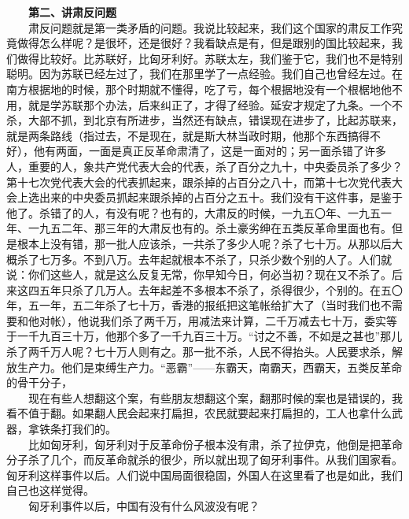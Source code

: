 \documentclass[cn,11pt,chinese]{elegantbook}
\begin{document}
　　\textbf{第二、讲肃反问题}\\
　　肃反问题就是第一类矛盾的问题。我说比较起来，我们这个国家的肃反工作究竟做得怎么样呢？是很坏，还是很好？我看缺点是有，但是跟别的国比较起来，我们做得比较好。比苏联好，比匈牙利好。苏联太左，我们鉴于它，我们也不是特别聪明。因为苏联已经左过了，我们在那里学了一点经验。我们自己也曾经左过。在南方根据地的时候，那个时期就不懂得，吃了亏，每个根据地没有一个根椐地他不用，就是学苏联那个办法，后来纠正了，才得了经验。延安才规定了九条。一个不杀，大部不抓，到北京有所进步，当然还有缺点，错误现在进步了，比起苏联来，就是两条路线（指过去，不是现在，就是斯大林当政时期，他那个东西搞得不好），他有两面，一面是真正反革命肃清了，这是一面对的；另一面杀错了许多人，重要的人，象共产党代表大会的代表，杀了百分之九十，中央委员杀了多少？第十七次党代表大会的代表抓起来，跟杀掉的占百分之八十，而第十七次党代表大会上选出来的中央委员抓起来跟杀掉的占百分之五十。我们没有干这件事，是鉴于他了。杀错了的人，有没有呢？也有的，大肃反的时候，一九五〇年、一九五一年、一九五二年、那三年的大肃反也有的。杀土豪劣绅在五类反革命里面也有。但是根本上没有错，那一批人应该杀，一共杀了多少人呢？杀了七十万。从那以后大概杀了七万多。不到八万。去年起就根本不杀了，只杀少数个别的人了。人们就说：你们这些人，就是这么反复无常，你早知今日，何必当初？现在又不杀了。后来这四五年只杀了几万人。去年起差不多根本不杀了，杀得很少，个别的。在五〇年，五一年，五二年杀了七十万，香港的报纸把这笔帐给扩大了（当时我们也不需要和他对帐），他说我们杀了两千万，用减法来计算，二千万减去七十万，委实等于一千九百三十万，他那个多了一千九百三十万。“讨之不善，不如是之甚也”那儿杀了两千万人呢？七十万人则有之。那一批不杀，人民不得抬头。人民要求杀，解放生产力。他们是束缚生产力。“恶霸”——东霸天，南霸天，西霸天，五类反革命的骨干分子，\\
　　现在有些人想翻这个案，有些朋友想翻这个案，翻那时候的案也是错误的，我看不值于翻。如果翻人民会起来打扁担，农民就要起来打扁担的，工人也拿什么武器，拿铁条打我们的。\\
　　比如匈牙利，匈牙利对于反革命份子根本没有肃，杀了拉伊克，他倒是把革命分子杀了几个，而反革命就杀的很少，所以就出现了匈牙利事件。从我们国家看。匈牙利这样事件以后。人们说中国局面很稳固，外国人在这里看了也是如此，我们自己也这样觉得。\\
　　匈牙利事件以后，中国有没有什么风波没有呢？\\
\end{document}

